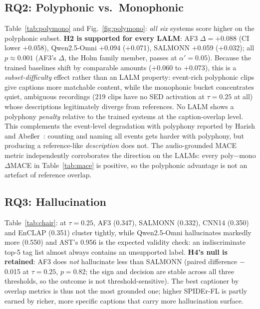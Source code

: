 \documentclass[conference]{IEEEtran}
\begin{document}
\subsection{RQ2: Polyphonic vs.\ Monophonic}
Table~\ref{tab:polymono} and Fig.~\ref{fig:polymono}: \emph{all six} systems score higher on the
polyphonic subset. \textbf{H2 is supported for every LALM}: AF3
$\Delta{=}{+}0.088$ (CI lower $+$0.058), Qwen2.5-Omni $+$0.094 ($+$0.071),
SALMONN $+$0.059 ($+$0.032); all $p\approx0.001$ (AF3's $\Delta$, the Holm
family member, passes at $\alpha'{=}0.05$). Because the
trained baselines shift by comparable amounts ($+$0.060 to $+$0.073), this is
a \emph{subset-difficulty} effect rather than an LALM property: event-rich
polyphonic clips give captions more matchable content, while the monophonic
bucket concentrates quiet, ambiguous recordings (219 clips have no SED
activation at $\tau{=}0.25$ at all) whose descriptions legitimately diverge
from references. No LALM shows a polyphony \emph{penalty} relative
to the trained systems at the caption-overlap level. This complements the
event-level degradation with polyphony reported by Harish and
Abe{\ss}er~\cite{harish2025dcase}: counting and naming all events gets harder
with polyphony, but producing a reference-like \emph{description} does not.
The audio-grounded MACE metric independently corroborates the direction on
the LALMs: every poly$-$mono $\Delta$MACE in Table~\ref{tab:mace} is positive,
so the polyphonic advantage is not an artefact of reference overlap.

\begin{table}[t]
\centering
\caption{MACE (audio-grounded, MS-CLAP backend) on the two subsets. Same direction as SPIDEr-FL; note SALMONN and Qwen2.5-Omni are nearly level here despite a 0.037 SPIDEr-FL gap.}
\label{tab:mace}
\end{table}

\begin{table}[t]
\centering
\caption{CHAIR-audio caption-level hallucination rates (dual criterion), lower is better.}
\label{tab:chair}
\end{table}

\subsection{RQ3: Hallucination}
Table~\ref{tab:chair}: at $\tau{=}0.25$, AF3 (0.347), SALMONN (0.332), CNN14
(0.350) and EnCLAP (0.351) cluster tightly, while Qwen2.5-Omni hallucinates
markedly more (0.550) and AST's 0.956 is the expected validity check: an
indiscriminate top-5 tag list almost always contains an unsupported label.
\textbf{H4's null is retained}: AF3 does \emph{not} hallucinate less than
SALMONN (paired difference $-$0.015 at $\tau{=}0.25$, $p{=}0.82$; the sign and
decision are stable across all three thresholds, so the outcome is not
threshold-sensitive). The best captioner by overlap metrics is thus not the
most grounded one; higher SPIDEr-FL is partly earned by richer, more
specific captions that carry more hallucination surface.
\end{document}
